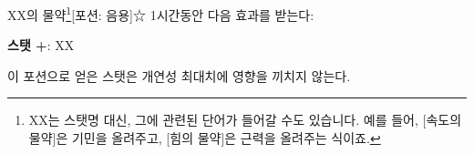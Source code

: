 \documentclass{report}
\begin{document}
	\begin{story}{XX의 물약\footnote{XX는 스탯명 대신, 그에 관련된 단어가 들어갈 수도 있습니다. 예를 들어, [속도의 물약]은 기민을 올려주고, [힘의 물약]은 근력을 올려주는 식이죠.}}{[포션: 음용]☆}
		1시간동안 다음 효과를 받는다:
		
		\textbf{스탯 +}: XX
		
		이 포션으로 얻은 스탯은 개연성 최대치에 영향을 끼치지 않는다.
		
	\end{story}
\end{document}
